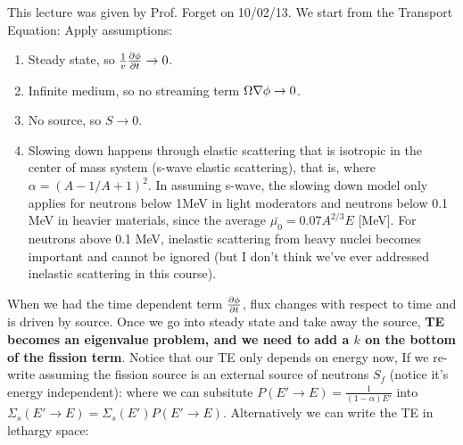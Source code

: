 \documentclass{school-22.211-notes}
\begin{document}
\clearpage
{} \label{slowing-down-from-te}
This lecture was given by Prof. Forget on 10/02/13. We start from the Transport Equation:
Apply assumptions:
\begin{enumerate}
\item Steady state, so $\frac{1}{v} \frac{\partial \phi}{\partial t} \to 0$. 
\item Infinite medium, so no streaming term $\Omega \nabla \phi \to 0$. 
\item No source, so $S \to 0$. 
\item Slowing down happens through elastic scattering that is isotropic in the center of mass system (s-wave elastic scattering), that is, 
  where $\alpha = (A-1/A+1)^2$. In assuming s-wave, the slowing down model only applies for neutrons below 1MeV in light moderators and neutrons below 0.1 MeV in heavier materials, since the average $\bar{\mu_0} = 0.07 A^{2/3}E$ [MeV].  For neutrons above 0.1 MeV, inelastic scattering from heavy nuclei becomes important and cannot be ignored (but I don't think we've ever addressed inelastic scattering in this course).
\end{enumerate}

When we had the time dependent term $\frac{\partial \phi}{\partial t}$, flux changes with respect to time and is driven by source. Once we go into steady state and take away the source, \textbf{TE becomes an eigenvalue problem, and we need to add a $k$ on the bottom of the fission term}. Notice that our TE only depends on energy now,  
If we re-write assuming the fission source is an external source of neutrons $S_f$ (notice it's energy independent): 
where we can subsitute $P(E'\to E) = \frac{1}{(1-\alpha)E'}$ into $\Sigma_s(E' \to E) = \Sigma_s(E') P(E' \to E)$. Alternatively we can write the TE in lethargy space: 
\end{document}
